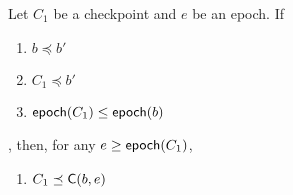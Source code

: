 \documentclass{article}
\begin{document}

\begin{property}\label{prop:on-chkp-prec}
    Let $C_1$ be a checkpoint and $e$ be an epoch.
    If
    \begin{enumerate}
        \item $b \preceq b'$
        \item $C_1 \preceq b'$
        \item $\mathsf{epoch}(C_1) \leq \mathsf{epoch}(b)$
    \end{enumerate}, 
    then, for any $e \geq \mathsf{epoch}(C_1)$,
    \begin{enumerate}
        \item $C_1 \preceq \mathsf{C}(b,e)$
    \end{enumerate}
\end{property}
\end{document}
